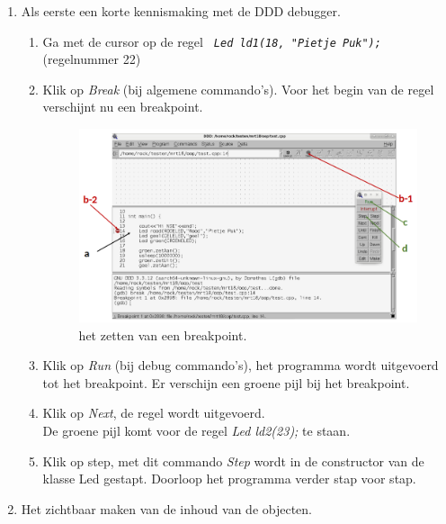 \begin{enumerate} [label=\alph*]
	\item Als eerste een korte kennismaking met de DDD debugger.
\begin{enumerate} [label=\roman*]

	\item Ga met de cursor op de regel \texttt{\textit{ Led ld1(18, "Pietje Puk");}}
	(regelnummer 22)
	\item Klik op \textit{Break} (bij algemene commando's). Voor het begin van de regel verschijnt nu een breakpoint.

\begin{figure}[h!]
	\captionsetup{justification=centering}
	\includegraphics[width=0.7 \linewidth]{figuren/ddd_set_breakpoint}
	\centering
	\caption{het zetten van een breakpoint.}
	\label{fig:ddduitv1}
\end{figure}
	\item Klik op \textit{Run} (bij debug commando's),
het programma wordt uitgevoerd tot het breakpoint. Er verschijn een groene pijl bij het breakpoint.
\item Klik op \textit{Next}, de regel wordt uitgevoerd. \\
De groene pijl komt voor de regel \textit{Led ld2(23);} te staan. 
\item Klik op step, met dit commando \textit{Step} wordt in de constructor van de klasse Led gestapt. Doorloop het programma verder stap voor stap.

\end{enumerate}
\item Het zichtbaar maken van de inhoud van de objecten.



\end{enumerate}
